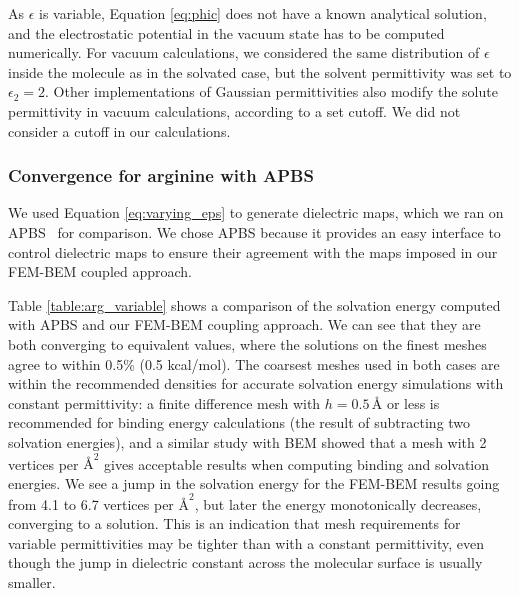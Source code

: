 As $\epsilon$ is variable, Equation \eqref{eq:phic} does not have a known analytical solution, and the electrostatic potential in the vacuum state has to be computed numerically.
For vacuum calculations, we considered the same distribution of $\epsilon$ inside the molecule as in the solvated case, but the solvent permittivity was set to $\epsilon_2=2$. 
Other implementations of Gaussian permittivities also modify the solute permittivity in vacuum calculations, according to a set cutoff.\cite{li2013dielectric} We did not consider a cutoff in our calculations.

\subsubsection*{\sffamily \normalsize Convergence for arginine with APBS}

We used Equation \eqref{eq:varying_eps} to generate dielectric maps, which we ran on APBS~\cite{BakerETal2001} for comparison. 
We chose APBS because it provides an easy interface to control dielectric maps to ensure their agreement with the maps imposed in our FEM-BEM coupled approach.

Table \ref{table:arg_variable} shows a comparison of the solvation energy computed with APBS and our FEM-BEM coupling approach. We can see that they are both converging to equivalent values, where the solutions on the finest meshes agree to within 0.5\% (0.5 kcal/mol). The coarsest meshes used in both cases are within the recommended densities for accurate solvation energy simulations with constant permittivity: a finite difference mesh with $h=0.5\,\text{\AA}$ or less is recommended for binding energy calculations\cite{sorensen2015comprehensive} (the result of subtracting two solvation energies), and a similar study with BEM\cite{CooperBardhanBarba2014} showed that a mesh with 2 vertices per $\text{\AA}^2$ gives acceptable results when computing binding and solvation energies. We see a jump in the solvation energy for the FEM-BEM results going from 4.1 to 6.7 vertices per $\text{\AA}^2$, but later the energy monotonically decreases, converging to a solution. This is an indication that mesh requirements for variable permittivities may be tighter than with a constant permittivity, even though the jump in dielectric constant across the molecular surface is usually smaller. 

